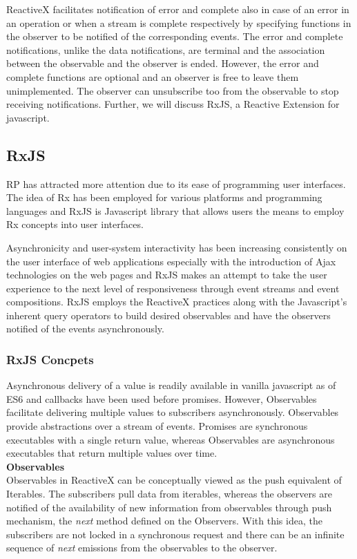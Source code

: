 ReactiveX facilitates notification of error and complete also in case of an error in an operation or when a stream is complete respectively by specifying functions in the observer to be notified of the corresponding events. The error and complete notifications, unlike the data notifications, are terminal and the association between the observable and the observer is ended. However, the error and complete functions are optional and an observer is free to leave them unimplemented. The observer can unsubscribe too from the observable to stop receiving notifications. Further, we will discuss RxJS, a Reactive Extension for javascript.

\subsection{RxJS}
RP has attracted more attention due to its ease of programming user interfaces\cite{Schuster:2016:RPR:2892664.2892666}\cite{Bainomugisha:2013:SRP:2501654.2501666}. The idea of Rx has been employed for various platforms and programming languages and RxJS is Javascript library that allows users the means to employ Rx concepts into user interfaces. 

Asynchronicity and user-system interactivity \cite{Kristaly:2008:WTW:1389586.1389663} has been increasing consistently on the user interface of web applications especially with the introduction of Ajax technologies\cite{ajaxANewWayToWP} on the web pages and RxJS makes an attempt to take the user experience to the next level of responsiveness through event streams and event compositions. RxJS employs the ReactiveX practices along with the Javascript's inherent query operators to build desired observables and have the observers notified of the events asynchronously.

\subsubsection{RxJS Concpets}
Asynchronous delivery of a value is readily available in vanilla javascript as of ES6\cite{ECMAScript} and callbacks have been used before promises. However, Observables\cite{observable} facilitate delivering multiple values to subscribers asynchronously. Observables provide abstractions over a stream of events. Promises are synchronous executables with a single return value, whereas Observables are asynchronous executables that return multiple values over time. 
\\
\textbf{Observables}
\\
Observables in ReactiveX can be conceptually viewed as the push equivalent of Iterables\cite{reactiveX}. The subscribers pull data from iterables, whereas the observers are notified of the availability of new information from observables through push mechanism, the \textit{next} method defined on the Observers. With this idea, the subscribers are not locked in a synchronous request and there can be an infinite sequence of \textit{next} emissions from the observables to the observer.

